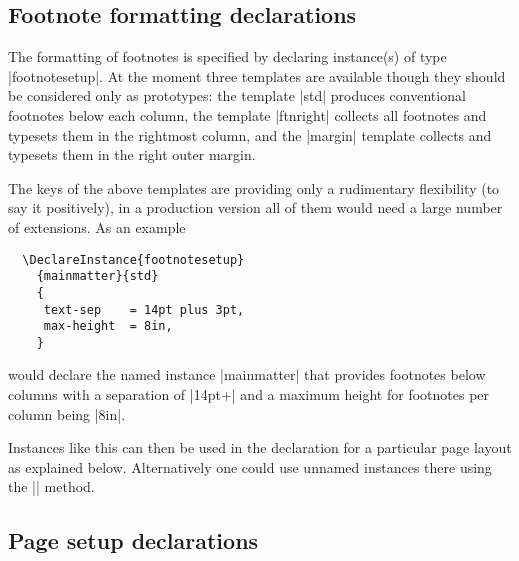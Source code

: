 \documentclass[twocolumn]{article}
\begin{document}
\subsection{Footnote formatting declarations}

The formatting of footnotes is specified by declaring instance(s) of
type |footnotesetup|. At the moment three templates are available
though they should be considered only as prototypes: the template
|std| produces conventional footnotes below each column, the template
|ftnright| collects all footnotes and typesets them in the rightmost
column, and the |margin| template collects and typesets them in the
right outer margin.

The keys of the above templates are providing only a rudimentary
flexibility (to say it positively), in a production version all of
them would need a large number of extensions.
As an example
\begin{verbatim}
  \DeclareInstance{footnotesetup}
    {mainmatter}{std}
    {
     text-sep    = 14pt plus 3pt,
     max-height  = 8in,
    }
\end{verbatim}
would declare the named instance |mainmatter| that provides footnotes
below columns with a separation of |14pt+| and a maximum height for
footnotes per column being |8in|.

Instances like this can then be used in the declaration for a
particular page layout as explained below. Alternatively one could use
unnamed instances there using the |\UseTemplate| method.


\subsection{Page setup declarations}
\end{document}
